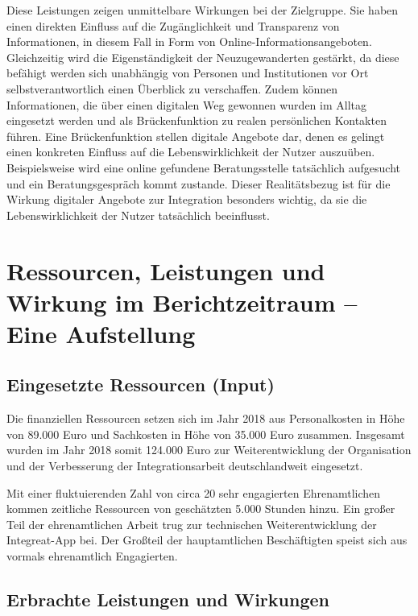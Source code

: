 \documentclass[12pt, a4paper]{article} %
\begin{document}
Diese Leistungen zeigen unmittelbare Wirkungen bei der Zielgruppe. Sie
haben einen direkten Einfluss auf die Zugänglichkeit und Transparenz von
Informationen, in diesem Fall in Form von Online-Informationsangeboten.
Gleichzeitig wird die Eigenständigkeit der Neuzugewanderten gestärkt, da
diese befähigt werden sich unabhängig von Personen und Institutionen vor
Ort selbstverantwortlich einen Überblick zu verschaffen. Zudem können
Informationen, die über einen digitalen Weg gewonnen wurden im Alltag
eingesetzt werden und als Brückenfunktion zu realen persönlichen
Kontakten führen. Eine Brückenfunktion stellen digitale Angebote dar,
denen es gelingt einen konkreten Einfluss auf die Lebenswirklichkeit der
Nutzer auszuüben. Beispielsweise wird eine online gefundene
Beratungsstelle tatsächlich aufgesucht und ein Beratungsgespräch kommt
zustande. Dieser Realitätsbezug ist für die Wirkung digitaler Angebote
zur Integration besonders wichtig, da sie die Lebenswirklichkeit der
Nutzer tatsächlich beeinflusst.

\hypertarget{ressourcen-leistungen-und-wirkung-im-berichtzeitraum-eine-aufstellung}{%
\section{Ressourcen, Leistungen und Wirkung im Berichtzeitraum – Eine
Aufstellung}\label{ressourcen-leistungen-und-wirkung-im-berichtzeitraum-eine-aufstellung}}

\hypertarget{eingesetzte-ressourcen-input}{%
\subsection{Eingesetzte Ressourcen (Input)
}\label{eingesetzte-ressourcen-input}}

Die finanziellen Ressourcen setzen sich im Jahr 2018 aus Personalkosten
in Höhe von 89.000 Euro und Sachkosten in Höhe von 35.000 Euro zusammen.
Insgesamt wurden im Jahr 2018 somit 124.000 Euro zur Weiterentwicklung
der Organisation und der Verbesserung der Integrationsarbeit
deutschlandweit eingesetzt.

Mit einer fluktuierenden Zahl von circa 20 sehr engagierten
Ehrenamtlichen kommen zeitliche Ressourcen von geschätzten 5.000 Stunden
hinzu. Ein großer Teil der ehrenamtlichen Arbeit trug zur technischen
Weiterentwicklung der Integreat-App bei. Der Großteil der hauptamtlichen
Beschäftigten speist sich aus vormals ehrenamtlich Engagierten.

\hypertarget{erbrachte-leistungen-und-wirkungen}{%
\subsection{Erbrachte Leistungen und
Wirkungen}\label{erbrachte-leistungen-und-wirkungen}}
\end{document}
